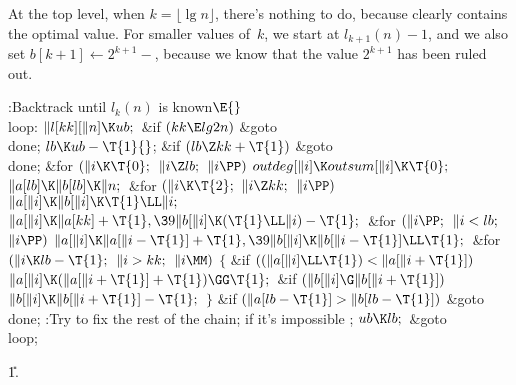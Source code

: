 At the top level, when $k=\lfloor\lg n\rfloor$, there's nothing to do,
because  clearly contains the optimal value.
For smaller values of~$k$, we start at $l_{k+1}(n)-1$, and we
also set $b[k+1]\gets2^{k+1}-$, because we know that the value
$2^{k+1}$ has been ruled out.

\Y\B\4:Backtrack until $l_k(n)$ is known\X${}\E{}$\6
\4\\{loop}:\5
${}\|l[\\{kk}][\|n]\K\\{ub};{}$\6
\&{if} ${}(\\{kk}\E\\{lg2n}){}$\1\5
\&{goto} \\{done};\2\6
${}\\{lb}\K\\{ub}-\T{1}{}$;\6
\&{if} ${}(\\{lb}\Z\\{kk}+\T{1}){}$\1\5
\&{goto} \\{done};\2\6
\&{for} ${}(\|i\K\T{0};{}$ ${}\|i\Z\\{lb};{}$ ${}\|i\PP){}$\1\5
${}\\{outdeg}[\|i]\K\\{outsum}[\|i]\K\T{0};{}$\2\6
${}\|a[\\{lb}]\K\|b[\\{lb}]\K\|n;{}$\6
\&{for} ${}(\|i\K\T{2};{}$ ${}\|i\Z\\{kk};{}$ ${}\|i\PP){}$\1\5
${}\|a[\|i]\K\|b[\|i]\K\T{1}\LL\|i;{}$\2\6
${}\|a[\|i]\K\|a[\\{kk}]+\T{1},\39\|b[\|i]\K(\T{1}\LL\|i)-\T{1};{}$\6
\&{for} ${}(\|i\PP;{}$ ${}\|i<\\{lb};{}$ ${}\|i\PP){}$\1\5
${}\|a[\|i]\K\|a[\|i-\T{1}]+\T{1},\39\|b[\|i]\K\|b[\|i-\T{1}]\LL\T{1};{}$\2\6
\&{for} ${}(\|i\K\\{lb}-\T{1};{}$ ${}\|i>\\{kk};{}$ ${}\|i\MM){}$\5
${}\{{}$\1\6
\&{if} ${}((\|a[\|i]\LL\T{1})<\|a[\|i+\T{1}]){}$\1\5
${}\|a[\|i]\K(\|a[\|i+\T{1}]+\T{1})\GG\T{1};{}$\2\6
\&{if} ${}(\|b[\|i]\G\|b[\|i+\T{1}]){}$\1\5
${}\|b[\|i]\K\|b[\|i+\T{1}]-\T{1};{}$\2\6
\4${}\}{}$\2\6
\&{if} ${}(\|a[\\{lb}-\T{1}]>\|b[\\{lb}-\T{1}]){}$\1\5
\&{goto} \\{done};\2\6
:Try to fix the rest of the chain;  if it's impossible%
\X;\6
${}\\{ub}\K\\{lb};{}$\6
\&{goto} \\{loop};\par
\U1.\fi

